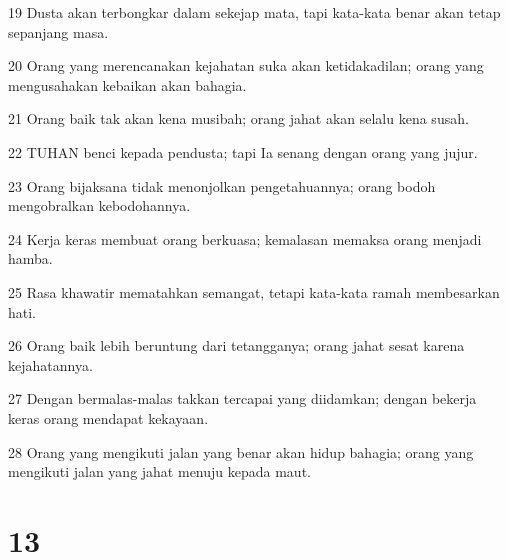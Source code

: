 \par 19 Dusta akan terbongkar dalam sekejap mata, tapi kata-kata benar akan tetap sepanjang masa.
\par 20 Orang yang merencanakan kejahatan suka akan ketidakadilan; orang yang mengusahakan kebaikan akan bahagia.
\par 21 Orang baik tak akan kena musibah; orang jahat akan selalu kena susah.
\par 22 TUHAN benci kepada pendusta; tapi Ia senang dengan orang yang jujur.
\par 23 Orang bijaksana tidak menonjolkan pengetahuannya; orang bodoh mengobralkan kebodohannya.
\par 24 Kerja keras membuat orang berkuasa; kemalasan memaksa orang menjadi hamba.
\par 25 Rasa khawatir mematahkan semangat, tetapi kata-kata ramah membesarkan hati.
\par 26 Orang baik lebih beruntung dari tetangganya; orang jahat sesat karena kejahatannya.
\par 27 Dengan bermalas-malas takkan tercapai yang diidamkan; dengan bekerja keras orang mendapat kekayaan.
\par 28 Orang yang mengikuti jalan yang benar akan hidup bahagia; orang yang mengikuti jalan yang jahat menuju kepada maut.

\chapter{13}

